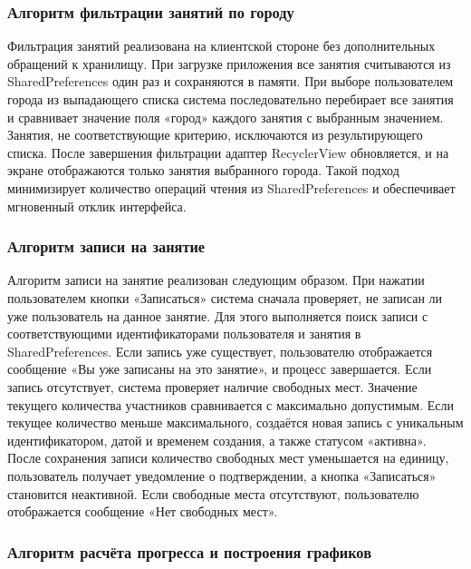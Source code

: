 \subsubsection{Алгоритм фильтрации занятий по городу}

Фильтрация занятий реализована на клиентской стороне без дополнительных обращений к хранилищу. При загрузке приложения все занятия считываются из SharedPreferences один раз и сохраняются в памяти. При выборе пользователем города из выпадающего списка система последовательно перебирает все занятия и сравнивает значение поля «город» каждого занятия с выбранным значением. Занятия, не соответствующие критерию, исключаются из результирующего списка. После завершения фильтрации адаптер RecyclerView обновляется, и на экране отображаются только занятия выбранного города. Такой подход минимизирует количество операций чтения из SharedPreferences и обеспечивает мгновенный отклик интерфейса.

\subsubsection{Алгоритм записи на занятие}

Алгоритм записи на занятие реализован следующим образом. При нажатии пользователем кнопки «Записаться» система сначала проверяет, не записан ли уже пользователь на данное занятие. Для этого выполняется поиск записи с соответствующими идентификаторами пользователя и занятия в SharedPreferences. Если запись уже существует, пользователю отображается сообщение «Вы уже записаны на это занятие», и процесс завершается. Если запись отсутствует, система проверяет наличие свободных мест. Значение текущего количества участников сравнивается с максимально допустимым. Если текущее количество меньше максимального, создаётся новая запись с уникальным идентификатором, датой и временем создания, а также статусом «активна». После сохранения записи количество свободных мест уменьшается на единицу, пользователь получает уведомление о подтверждении, а кнопка «Записаться» становится неактивной. Если свободные места отсутствуют, пользователю отображается сообщение «Нет свободных мест».

\subsubsection{Алгоритм расчёта прогресса и построения графиков}

